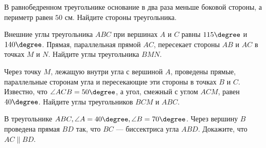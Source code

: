 \begin{homework}[number=3]
	\begin{listofex}
		\item В равнобедренном треугольнике основание в два раза меньше боковой стороны, а периметр равен \(50\) см. Найдите стороны треугольника.
		\item Внешние углы треугольника \(ABC\) при вершинах \(A\) и \(C\) равны \(115\degree\) и \(140\degree \). Прямая, параллельная прямой \(AC\), пересекает стороны \(AB\) и \(AC\) в точках \(M\) и \(N\). Найдите углы треугольника \(BMN\).
		\item Через точку \(M\), лежащую внутри угла с вершиной \(A\), проведены прямые, параллельные сторонам угла и пересекающие эти стороны в точках \(B\) и \(C\). Известно, что \(\angle ACB = 50\degree\), а угол, смежный с углом \(ACM\), равен \(40\degree\). Найдите углы треугольников \(BCM\) и \(ABC\).
		\item В треугольнике \( ABC, \angle A = 40 \degree, \angle B = 70 \degree \). Через вершину \(B\) проведена прямая \(BD\) так, что \(BC\) --- биссектриса угла \(ABD\). Докажите, что \(AC \parallel BD\).
	\end{listofex}
\end{homework}

